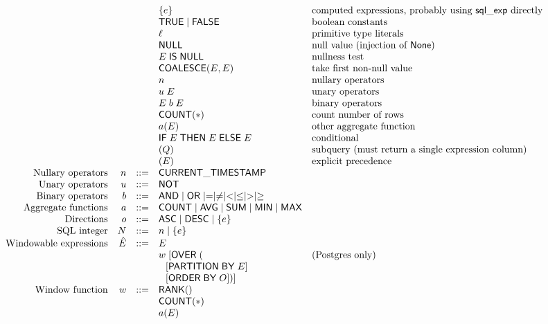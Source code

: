 \documentclass{article}
\newcommand{\mt}[1]{\mathsf{#1}}
\begin{document}
$$\begin{array}{rrcll}
  &&& \{e\} & \textrm{computed expressions, probably using $\mt{sql\_exp}$ directly} \\
  &&& \mt{TRUE} \mid \mt{FALSE} & \textrm{boolean constants} \\
  &&& \ell & \textrm{primitive type literals} \\
  &&& \mt{NULL} & \textrm{null value (injection of $\mt{None}$)} \\
  &&& E \; \mt{IS} \; \mt{NULL} & \textrm{nullness test} \\
  &&& \mt{COALESCE}(E, E) & \textrm{take first non-null value} \\
  &&& n & \textrm{nullary operators} \\
  &&& u \; E & \textrm{unary operators} \\
  &&& E \; b \; E & \textrm{binary operators} \\
  &&& \mt{COUNT}(\ast) & \textrm{count number of rows} \\
  &&& a(E) & \textrm{other aggregate function} \\
  &&& \mt{IF} \; E \; \mt{THEN} \; E \; \mt{ELSE} \; E & \textrm{conditional} \\
  &&& (Q) & \textrm{subquery (must return a single expression column)} \\
  &&& (E) & \textrm{explicit precedence} \\
  \textrm{Nullary operators} & n &::=& \mt{CURRENT\_TIMESTAMP} \\
  \textrm{Unary operators} & u &::=& \mt{NOT} \\
  \textrm{Binary operators} & b &::=& \mt{AND} \mid \mt{OR} \mid = \mid \neq \mid < \mid \leq \mid > \mid \geq \\
  \textrm{Aggregate functions} & a &::=& \mt{COUNT} \mid \mt{AVG} \mid \mt{SUM} \mid \mt{MIN} \mid \mt{MAX} \\
  \textrm{Directions} & o &::=& \mt{ASC} \mid \mt{DESC} \mid \{e\} \\
  \textrm{SQL integer} & N &::=& n \mid \{e\} \\
  \textrm{Windowable expressions} & \hat{E} &::=& E \\
  &&& w \; [\mt{OVER} \; ( & \textrm{(Postgres only)} \\
  &&& \hspace{.1in} [\mt{PARTITION} \; \mt{BY} \; E] \\
  &&& \hspace{.1in} [\mt{ORDER} \; \mt{BY} \; O])] \\
  \textrm{Window function} & w &::=& \mt{RANK}() \\
  &&& \mt{COUNT}(*) \\
  &&& a(E)
\end{array}$$
\end{document}

